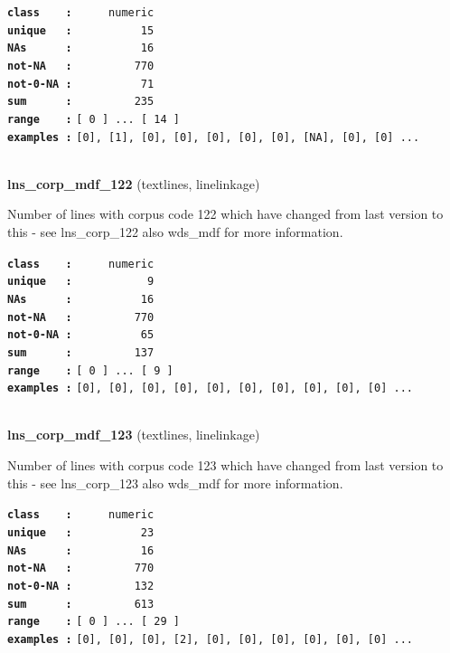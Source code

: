 \documentclass[]{article}
\begin{document}
\textbf{\texttt{class\ \ \ \ :}} \texttt{~~~~~numeric}\\
\textbf{\texttt{unique\ \ \ :}} \texttt{~~~~~~~~~~15}\\
\textbf{\texttt{NAs\ \ \ \ \ \ :}} \texttt{~~~~~~~~~~16}\\
\textbf{\texttt{not-NA\ \ \ :}} \texttt{~~~~~~~~~770}\\
\textbf{\texttt{not-0-NA\ :}} \texttt{~~~~~~~~~~71}\\
\textbf{\texttt{sum\ \ \ \ \ \ :}} \texttt{~~~~~~~~~235}\\
\textbf{\texttt{range\ \ \ \ :}}
\texttt{{[}\ 0\ {]}\ ...\ {[}\ 14\ {]}}\\
\textbf{\texttt{examples\ :}}
\texttt{{[}0{]},\ {[}1{]},\ {[}0{]},\ {[}0{]},\ {[}0{]},\ {[}0{]},\ {[}0{]},\ {[}NA{]},\ {[}0{]},\ {[}0{]}\ ...}\\

~

\textbf{lns\_corp\_mdf\_122} (textlines, linelinkage)

Number of lines with corpus code 122 which have changed from last
version to this - see lns\_corp\_122 also wds\_mdf for more information.

\textbf{\texttt{class\ \ \ \ :}} \texttt{~~~~~numeric}\\
\textbf{\texttt{unique\ \ \ :}} \texttt{~~~~~~~~~~~9}\\
\textbf{\texttt{NAs\ \ \ \ \ \ :}} \texttt{~~~~~~~~~~16}\\
\textbf{\texttt{not-NA\ \ \ :}} \texttt{~~~~~~~~~770}\\
\textbf{\texttt{not-0-NA\ :}} \texttt{~~~~~~~~~~65}\\
\textbf{\texttt{sum\ \ \ \ \ \ :}} \texttt{~~~~~~~~~137}\\
\textbf{\texttt{range\ \ \ \ :}}
\texttt{{[}\ 0\ {]}\ ...\ {[}\ 9\ {]}}\\
\textbf{\texttt{examples\ :}}
\texttt{{[}0{]},\ {[}0{]},\ {[}0{]},\ {[}0{]},\ {[}0{]},\ {[}0{]},\ {[}0{]},\ {[}0{]},\ {[}0{]},\ {[}0{]}\ ...}\\

~

\textbf{lns\_corp\_mdf\_123} (textlines, linelinkage)

Number of lines with corpus code 123 which have changed from last
version to this - see lns\_corp\_123 also wds\_mdf for more information.

\textbf{\texttt{class\ \ \ \ :}} \texttt{~~~~~numeric}\\
\textbf{\texttt{unique\ \ \ :}} \texttt{~~~~~~~~~~23}\\
\textbf{\texttt{NAs\ \ \ \ \ \ :}} \texttt{~~~~~~~~~~16}\\
\textbf{\texttt{not-NA\ \ \ :}} \texttt{~~~~~~~~~770}\\
\textbf{\texttt{not-0-NA\ :}} \texttt{~~~~~~~~~132}\\
\textbf{\texttt{sum\ \ \ \ \ \ :}} \texttt{~~~~~~~~~613}\\
\textbf{\texttt{range\ \ \ \ :}}
\texttt{{[}\ 0\ {]}\ ...\ {[}\ 29\ {]}}\\
\textbf{\texttt{examples\ :}}
\texttt{{[}0{]},\ {[}0{]},\ {[}0{]},\ {[}2{]},\ {[}0{]},\ {[}0{]},\ {[}0{]},\ {[}0{]},\ {[}0{]},\ {[}0{]}\ ...}\\
\end{document}
